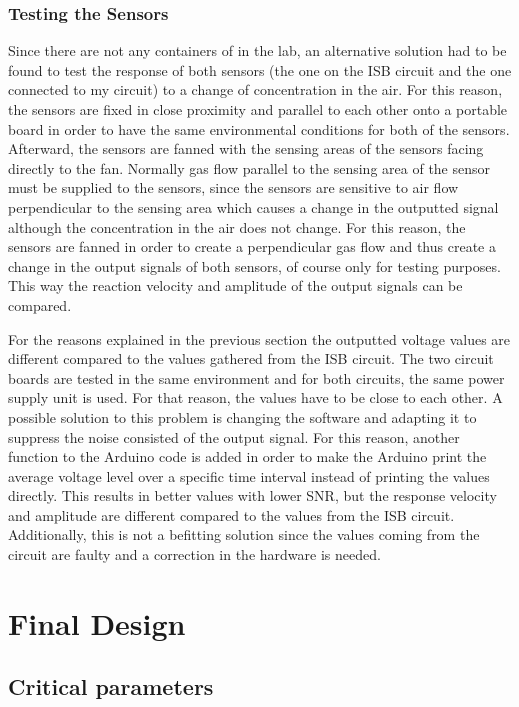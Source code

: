 \subsubsection{Testing the Sensors}
Since there are not any containers of  in the lab, an alternative solution had to be found to test the response of both sensors (the one on the ISB circuit and the one connected to my circuit) to a change of  concentration in the air. For this reason, the sensors are fixed in close proximity and parallel to each other onto a portable board in order to have the same environmental conditions for both of the sensors. Afterward, the sensors are fanned with the sensing areas of the sensors facing directly to the fan. Normally gas flow parallel to the sensing area of the sensor must be supplied to the sensors, since the sensors are sensitive to air flow perpendicular to the sensing area which causes a change in the outputted signal although the  concentration in the air does not change. For this reason, the sensors are fanned in order to create a perpendicular gas flow and thus create a change in the output signals of both sensors, of course only for testing purposes. This way the reaction velocity and amplitude of the output signals can be compared.\par 
For the reasons explained in the previous section the outputted voltage values are different compared to the values gathered from the ISB circuit. The two circuit boards are tested in the same environment and for both circuits, the same power supply unit is used. For that reason, the values have to be close to each other. A possible solution to this problem is changing the software and adapting it to suppress the noise consisted of the output signal. For this reason, another function to the Arduino code is added in order to make the Arduino print the average voltage level over a specific time interval instead of printing the values directly. This results in better values with lower SNR, but the response velocity and amplitude are different compared to the values from the ISB circuit. Additionally, this is not a befitting solution since the values coming from the circuit are faulty and a correction in the hardware is needed.  



\section{Final Design}
\subsection{Critical parameters}
\label{sub:criticalParameters}

